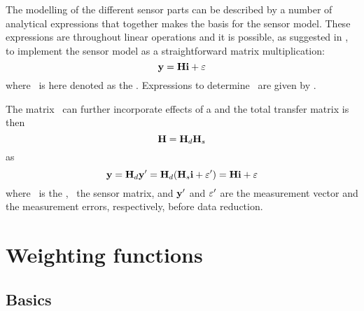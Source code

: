  The modelling of the different sensor parts can be described by a number of
 analytical expressions that together makes the basis for the sensor model.
 These expressions are throughout linear operations and it is possible, as
 suggested in \citet{eriksson:00a}, to implement the sensor model as a
 straightforward matrix multiplication:
 \begin{equation}
   \mathbf{y} = \mathbf{H} \mathbf{i} + \varepsilon
  \label{eq:formalism:H}
 \end{equation}
 where \SnsMtr\ is here denoted as the . 
 Expressions to determine \SnsMtr\ are given by \citet{eriksson:06}.

 The matrix \SnsMtr\ can further incorporate effects of a
  and the total transfer matrix is then
 \begin{equation}
   \mathbf{H} = \mathbf{H}_{d} \mathbf{H}_{s}
  \label{eq:formalism:Hs}
 \end{equation}
 as
 \begin{equation}
   \mathbf{y} = \mathbf{H}_{d} \mathbf{y}' = \mathbf{H}_{d} (\mathbf{H}_{s} \mathbf{i} + 
                                    \varepsilon') = \mathbf{H} \mathbf{i} + \varepsilon
  \label{eq:formalism:datared}
 \end{equation}
 where \ is the ,
 \ the sensor matrix, and $\mathbf{y}'$ and $\varepsilon'$ are
 the measurement vector and the measurement errors, respectively,
 before data reduction.



\section{Weighting functions} 
 \label{sec:formalism:wfuns}
 
 \subsection{Basics} 
 
